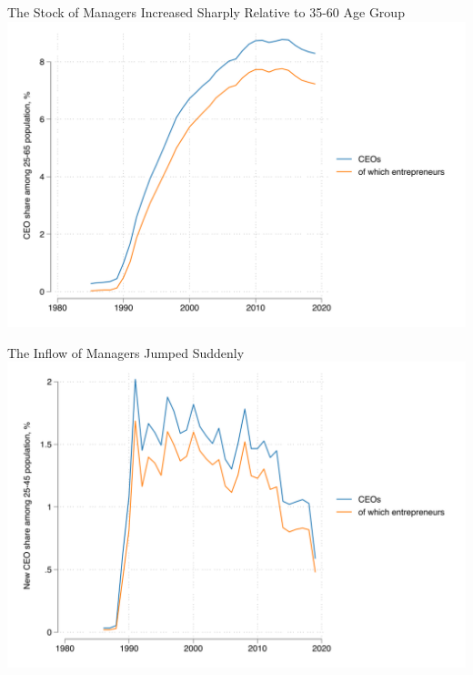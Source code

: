 \documentclass[
  ignorenonframetext,
  aspectratio=1610,
]{beamer}
\begin{document}
\begin{frame}{The Stock of Managers Increased Sharply Relative to 35-60
Age Group}
\protect\hypertarget{the-stock-of-managers-increased-sharply-relative-to-35-60-age-group}{}
\includegraphics{fig/ceo-stock.png}
\end{frame}

\begin{frame}{The Inflow of Managers Jumped Suddenly}
\protect\hypertarget{the-inflow-of-managers-jumped-suddenly}{}
\includegraphics{fig/ceo-flow.png}
\end{frame}
\end{document}
